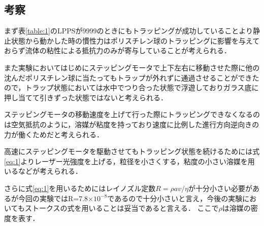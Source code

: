 \documentclass[11pt, a4paper,twocolumn]{jarticle}
\begin{document}
\subsection{考察}
まず表\ref{table:1}のLPPSが9999のときにもトラッピングが成功していることより静止状態から動かした時の慣性力はポリスチレン球のトラッピングに影響を与えておらず流体の粘性による抵抗力のみが寄与していることが考えられる．

また実験においてはじめにステッピングモータで上下左右に移動させた際に他の沈んだポリスチレン球に当たってもトラップが外れずに通過させることができたので，トラップ状態においては水中でつり合った状態で浮遊しておりガラス底に押し当てて引きずった状態ではないと考えられる．

ステッピングモータの移動速度を上げて行った際にトラッピングできなくなるのは空気抵抗のように，溶媒が粘度を持っており速度に比例した進行方向逆向きの力が働くためだと考えられる．

高速にステッピングモータを駆動させてもトラッピング状態を続けるためには式\ref{eq:1}よりレーザー光強度を上げる，粒径を小さくする，粘度の小さい溶媒を用いるなどが考えられる．

さらに式\ref{eq:1}を用いるためにはレイノズル定数$R=\rho av/\eta$が十分小さい必要があるが今回の実験ではR=7.8$\times 10^{-8}$であるので十分小さいと言え，今後の実験においてもストークスの式を用いることは妥当であると言える．
ここで$\rho$は溶媒の密度を表す．



\newpage
\end{document}

